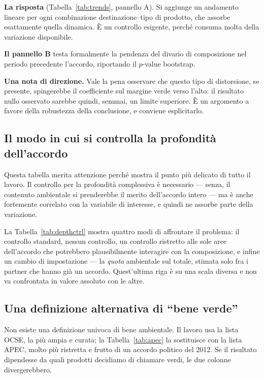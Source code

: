 \documentclass[11pt,a4paper]{article}
\begin{document}
\textbf{La risposta} (Tabella~\ref{tab:trends}, pannello A). Si aggiunge un andamento
lineare per ogni combinazione destinazione--tipo di prodotto, che assorbe esattamente quella
dinamica. \`E un controllo esigente, perch\'e consuma molta della variazione disponibile.

\textbf{Il pannello B} testa formalmente la pendenza del divario di composizione nel periodo
precedente l'accordo, riportando il $p$-value bootstrap.

\textbf{Una nota di direzione.} Vale la pena osservare che questo tipo di distorsione, se
presente, spingerebbe il coefficiente sul margine verde verso l'alto: il risultato nullo
osservato sarebbe quindi, semmai, un limite superiore. \`E un argomento a favore della
robustezza della conclusione, e conviene esplicitarlo.



\clearpage
\subsection{Il modo in cui si controlla la profondit\`a dell'accordo}

Questa tabella merita attenzione perch\'e mostra il punto pi\`u delicato di tutto il
lavoro. Il controllo per la profondit\`a complessiva \`e necessario --- senza, il contenuto
ambientale si prenderebbe il merito dell'accordo intero --- ma \`e anche fortemente
correlato con la variabile di interesse, e quindi ne assorbe parte della variazione.

La Tabella~\ref{tab:depthctrl} mostra quattro modi di affrontare il problema: il controllo
standard, nessun controllo, un controllo ristretto alle sole aree dell'accordo che
potrebbero plausibilmente interagire con la composizione, e infine un cambio di impostazione
--- la \emph{quota} ambientale sul totale, stimata solo fra i partner che hanno gi\`a un
accordo. Quest'ultima riga \`e su una scala diversa e non va confrontata in valore assoluto
con le altre.



\clearpage
\subsection{Una definizione alternativa di ``bene verde''}

Non esiste una definizione univoca di bene ambientale. Il lavoro usa la lista OCSE, la pi\`u
ampia e curata; la Tabella~\ref{tab:apec} la sostituisce con la lista APEC, molto pi\`u
ristretta e frutto di un accordo politico del 2012. Se il risultato dipendesse da quali
prodotti decidiamo di chiamare verdi, le due colonne divergerebbero.
\end{document}
